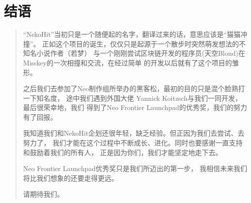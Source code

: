 \documentclass[11pt,UTF8,a4paper]{ctexart}
\begin{document}
    \section{结语}\label{sec:end}

    \begin{quotation}
        “NekoHit”当初只是一个随便起的名字，翻译过来的话，意思应该是“猫猫冲撞”。
        正如这个项目的诞生，仅仅只是起源于一个散步时突然萌发想法的不知名小说作者（若梦）
        与一个刚刚尝试区块链开发的程序员(天空Blond)在Misskey的一次相撞和交流，在经过简单
        的开发以后就有了这个项目的雏形。

        之后我们去参加了Neo制作组所举办的黑客松，最初的目的只是混个脸熟打一下知名度，
        途中我们遇到外国大佬 Yannick Koitzsch与我们一同开发，最后很荣幸地，我们
        得到了Neo Frontier Launchpad的优秀奖，我们的努力有了回报。

        我知道我们和NekoHit企划还很年轻，缺乏经验。但正因为我们去尝试、去努力了，
        我们才能在这个过程中不断成长、进化。同时也要感谢一直支持和鼓励着我们的所有人，
        正是因为你们，我们才能坚定地走下去。

        Neo Frontier Launchpad优秀奖只是我们所迈出的第一步，
        我相信未来我们将比我们想象的还要走得更远。

        请期待我们。

    \end{quotation}

    \clearpage

    
    
\end{document}
